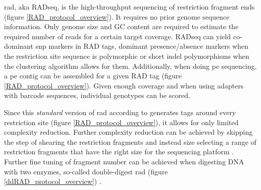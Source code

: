 \documentclass[a4paper,12pt,times,authoryear,twoside,print,index]{Classes/PhDThesisPSnPDF}\usepackage[]{graphicx}\usepackage[]{color}
\begin{document}
\gls{rad}, aka RADseq, is the high-throughput sequencing of restriction fragment ends (figure \ref{RAD_protocol_overview}). It requires no prior genome sequence information. Only genome size and GC content are required to estimate the required number of \glspl{read} for a certain target coverage. 
RADseq can yield co-dominant \gls{snp} markers in \glspl{RAD tag}, dominant presence/absence markers when the restriction site sequence is polymorphic or short \gls{indel} polymorphisms when the clustering algorithm allows for them. Additionally, when doing \gls{pe} sequencing, a \gls{pe} contig can be assembled for a given \gls{RAD tag} (figure \ref{RAD_protocol_overview}).
Given enough coverage and when using adapters with barcode sequences, individual genotypes can be scored.

Since this \emph{standard} version of \gls{rad} according to \cite{Baird2008} generates tags around every restriction site (figure \ref{RAD_protocol_overview}), it allows for only limited complexity reduction. Further complexity reduction can be achieved by skipping the step of shearing the restriction fragments and instead size selecting a range of restriction fragments that have the right size for the sequencing platform \citep{Andolfatto2011}. Further fine tuning of fragment number can be achieved when digesting DNA with two enzymes, so-called double-digest \gls{rad} (figure \ref{ddRAD_protocol_overview}) \citep{Peterson2012}.
\end{document}
